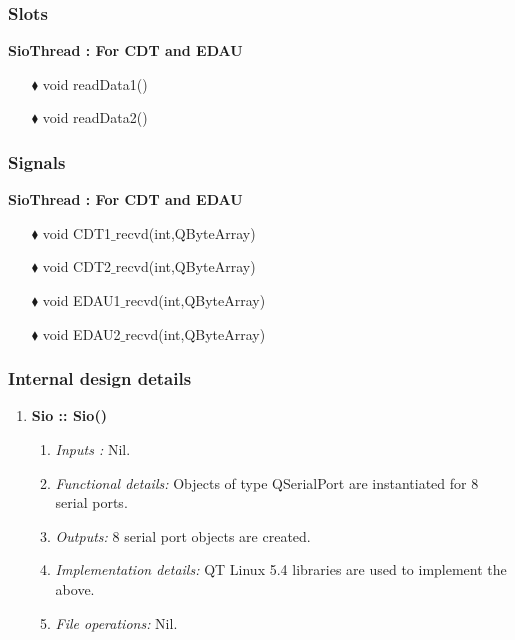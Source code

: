 \begin{enumerate}
\subsubsection{Slots}
\textbf{SioThread : For CDT and EDAU}\\
\begin{enumerate}
	\item [$\blacklozenge$] void readData1()
\end{enumerate}
\begin{enumerate}
	\item [$\blacklozenge$] void readData2()
\end{enumerate}

\subsubsection{Signals}
\textbf{SioThread : For CDT and EDAU}\\
\begin{enumerate}
	\item [$\blacklozenge$] void CDT1$\_$recvd(int,QByteArray)
	\item [$\blacklozenge$]void CDT2$\_$recvd(int,QByteArray)
	\item [$\blacklozenge$] void EDAU1$\_$recvd(int,QByteArray)
	\item [$\blacklozenge$]void EDAU2$\_$recvd(int,QByteArray)
\end{enumerate}

\subsubsection{Internal design details }
\begin{enumerate}
	\item  \textbf{Sio :: Sio()}
	\begin{enumerate}
		\item \textit{Inputs :} Nil.
		\item \textit{Functional details:} Objects of type QSerialPort are instantiated for 8 serial ports.
		\item \textit{Outputs:} 8 serial port objects are created.
		\item \textit{Implementation details:} 	QT Linux 5.4 libraries are used to implement the above.
		\item \textit{File operations:} Nil.
	\end{enumerate}
	

\end{enumerate}
\end{enumerate}
